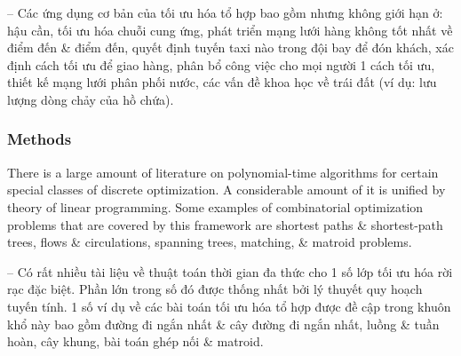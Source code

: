 \documentclass{article}
\begin{document}
-- Các ứng dụng cơ bản của tối ưu hóa tổ hợp bao gồm nhưng không giới hạn ở: hậu cần, tối ưu hóa chuỗi cung ứng, phát triển mạng lưới hàng không tốt nhất về điểm đến \& điểm đến, quyết định tuyến taxi nào trong đội bay để đón khách, xác định cách tối ưu để giao hàng, phân bổ công việc cho mọi người 1 cách tối ưu, thiết kế mạng lưới phân phối nước, các vấn đề khoa học về trái đất (ví dụ: lưu lượng dòng chảy của hồ chứa).


\subsubsection{Methods}
There is a large amount of literature on polynomial-time algorithms for certain special classes of discrete optimization. A considerable amount of it is unified by theory of linear programming. Some examples of combinatorial optimization problems that are covered by this framework are shortest paths \& shortest-path trees, flows \& circulations, spanning trees, matching, \& matroid problems.

-- Có rất nhiều tài liệu về thuật toán thời gian đa thức cho 1 số lớp tối ưu hóa rời rạc đặc biệt. Phần lớn trong số đó được thống nhất bởi lý thuyết quy hoạch tuyến tính. 1 số ví dụ về các bài toán tối ưu hóa tổ hợp được đề cập trong khuôn khổ này bao gồm đường đi ngắn nhất \& cây đường đi ngắn nhất, luồng \& tuần hoàn, cây khung, bài toán ghép nối \& matroid.
\end{document}
